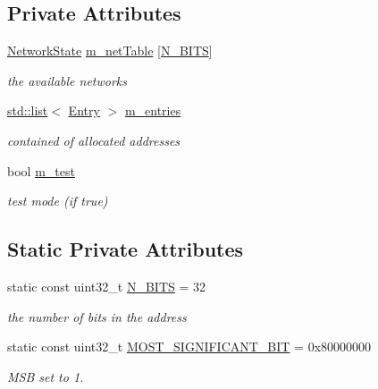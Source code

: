 \subsection*{Private Attributes}
\begin{DoxyCompactItemize}
\item 
\hyperlink{classns3_1_1Ipv4AddressGeneratorImpl_1_1NetworkState}{Network\+State} \hyperlink{classns3_1_1Ipv4AddressGeneratorImpl_a9cdf3f8008d6e9d7ce32272db4d6dcc9}{m\+\_\+net\+Table} \mbox{[}\hyperlink{classns3_1_1Ipv4AddressGeneratorImpl_a76a2bff7838831dc3d1027f12e4fac85}{N\+\_\+\+B\+I\+TS}\mbox{]}
\begin{DoxyCompactList}\small\item\em the available networks \end{DoxyCompactList}\item 
\hyperlink{openflow-interface_8h_afd9bcfa176617760671b67580f536fa7}{std\+::list}$<$ \hyperlink{classns3_1_1Ipv4AddressGeneratorImpl_1_1Entry}{Entry} $>$ \hyperlink{classns3_1_1Ipv4AddressGeneratorImpl_aa038cfd5736c3d67f5433c3a2aa20cbf}{m\+\_\+entries}
\begin{DoxyCompactList}\small\item\em contained of allocated addresses \end{DoxyCompactList}\item 
bool \hyperlink{classns3_1_1Ipv4AddressGeneratorImpl_ae80732b27ea2032ba783dce3f92d264b}{m\+\_\+test}
\begin{DoxyCompactList}\small\item\em test mode (if true) \end{DoxyCompactList}\end{DoxyCompactItemize}
\subsection*{Static Private Attributes}
\begin{DoxyCompactItemize}
\item 
static const uint32\+\_\+t \hyperlink{classns3_1_1Ipv4AddressGeneratorImpl_a76a2bff7838831dc3d1027f12e4fac85}{N\+\_\+\+B\+I\+TS} = 32
\begin{DoxyCompactList}\small\item\em the number of bits in the address \end{DoxyCompactList}\item 
static const uint32\+\_\+t \hyperlink{classns3_1_1Ipv4AddressGeneratorImpl_ad39d68d2d28c578b8c90be437c853c35}{M\+O\+S\+T\+\_\+\+S\+I\+G\+N\+I\+F\+I\+C\+A\+N\+T\+\_\+\+B\+IT} = 0x80000000
\begin{DoxyCompactList}\small\item\em M\+SB set to 1. \end{DoxyCompactList}\end{DoxyCompactItemize}


